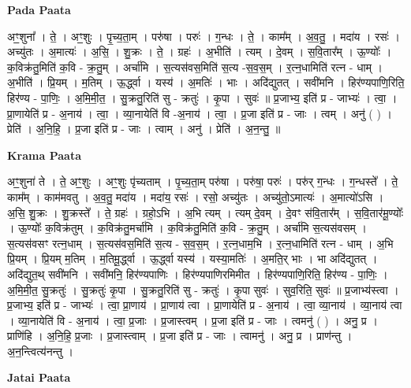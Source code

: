 \documentclass[17pt]{extarticle}
\begin{document}
\textbf{Pada Paata} \newline

अꣳ॒॒शुना᳚ । ते॒ । अꣳ॒॒शुः । पृ॒च्य॒ता॒म् । परु॑षा । परुः॑ । ग॒न्धः । ते॒ । काम᳚म् । अ॒व॒तु॒ । मदा॑य । रसः॑ । अच्यु॑तः । अ॒मात्यः॑ । अ॒सि॒ । शु॒क्रः । ते॒ । ग्रहः॑ । अ॒भीति॑ । त्यम् । दे॒वम् । स॒वि॒तार᳚म् । ऊ॒ण्योः᳚ । क॒विक्र॑तु॒मिति॑ क॒वि - क्र॒तु॒म् । अर्चा॑मि । स॒त्यस॑वस॒मिति॑ स॒त्य -स॒व॒स॒म् । र॒त्न॒धामिति॑ रत्न - धाम् । अ॒भीति॑ । प्रि॒यम् । म॒तिम् । ऊ॒र्द्ध्वा । यस्य॑ । अ॒मतिः॑ । भाः । अदि॑द्युतत् । सवी॑मनि । हिर॑ण्यपाणि॒रिति॒ हिर॑ण्य - पा॒णिः॒ । अ॒मि॒मी॒त॒ । सु॒क्रतु॒रिति॑ सु - क्रतुः॑ । कृ॒पा । सुवः॑ ॥ प्र॒जाभ्य॒ इति॑ प्र - जाभ्यः॑ । त्वा॒ । प्रा॒णायेति॑ प्र - अ॒नाय॑ । त्वा॒ । व्या॒नायेति॑ वि -अ॒नाय॑ । त्वा॒ । प्र॒जा इति॑ प्र - जाः । त्वम् । अनु॑ ( ) । प्रेति॑ । अ॒नि॒हि॒ । प्र॒जा इति॑ प्र - जाः । त्वाम् । अनु॑ । प्रेति॑ । अ॒न॒न्तु॒ ॥  \newline


\textbf{Krama Paata} \newline

अꣳ॒॒शुना॑ ते । ते॒ अꣳ॒॒शुः । अꣳ॒॒शुः पृ॑च्यताम् । पृ॒च्य॒ता॒म् परु॑षा । परु॑षा॒ परुः॑ । परु॑र् ग॒न्धः । ग॒न्धस्ते᳚ । ते॒ काम᳚म् । काम॑मवतु । अ॒व॒तु॒ मदा॑य । मदा॑य॒ रसः॑ । रसो॒ अच्यु॑तः । अच्यु॑तो॒ऽमात्यः॑ । अ॒मात्यो॑ऽसि । अ॒सि॒ शु॒क्रः । शु॒क्रस्ते᳚ । ते॒ ग्रहः॑ । ग्रहो॒ऽभि । अ॒भि त्यम् । त्यम् दे॒वम् । दे॒वꣳ स॑वि॒तार᳚म् । स॒वि॒तार॑मू॒ण्योः᳚ । ऊ॒ण्योः᳚ क॒विक्र॑तुम् । क॒विक्र॑तु॒मर्चा॑मि । क॒विक्र॑तु॒मिति॑ क॒वि - क्र॒तु॒म् । अर्चा॑मि स॒त्यस॑वसम् । स॒त्यस॑वसꣳ रत्न॒धाम् । स॒त्यस॑वस॒मिति॑ स॒त्य - स॒व॒स॒म् । र॒त्न॒धाम॒भि । र॒त्न॒धामिति॑ रत्न - धाम् । अ॒भि प्रि॒यम् । प्रि॒यम् म॒तिम् । म॒तिमू॒र्द्ध्वा । ऊ॒र्द्ध्वा यस्य॑ । यस्या॒मतिः॑ । अ॒मति॒र् भाः । भा अदि॑द्युतत् । अदि॑द्युत॒थ् सवी॑मनि । सवी॑मनि॒ हिर॑ण्यपाणिः । हिर॑ण्यपाणिरमिमीत । हिर॑ण्यपाणि॒रिति॒ हिर॑ण्य - पा॒णिः॒ । अ॒मि॒मी॒त॒ सु॒क्रतुः॑ । सु॒क्रतुः॑ कृ॒पा । सु॒क्रतु॒रिति॑ सु - क्रतुः॑ । कृ॒पा सुवः॑ । सुव॒रिति॒ सुवः॑ ॥ प्र॒जाभ्य॑स्त्वा । प्र॒जाभ्य॒ इति॑ प्र - जाभ्यः॑ । त्वा॒ प्रा॒णाय॑ । प्रा॒णाय॑ त्वा । प्रा॒णायेति॑ प्र - अ॒नाय॑ । त्वा॒ व्या॒नाय॑ । व्या॒नाय॑ त्वा । व्या॒नायेति॑ वि - अ॒नाय॑ । त्वा॒ प्र॒जाः । प्र॒जास्त्वम् । प्र॒जा इति॑ प्र - जाः । त्वमनु॑ ( ) । अनु॒ प्र । प्राणि॑हि । अ॒नि॒हि॒ प्र॒जाः । प्र॒जास्त्वाम् । प्र॒जा इति॑ प्र - जाः । त्वामनु॑  । अनु॒ प्र । प्राण॑न्तु । अ॒न॒न्त्वित्य॑नन्तु । \newline

\textbf{Jatai Paata} \newline
\end{document}
